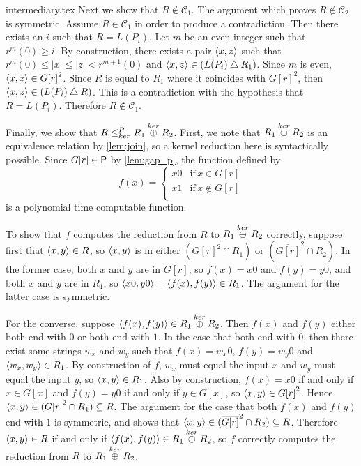 \begin{filecontents}{intermediary.tex}
  Next we show that $R\notin\mathcal{C}_1$.
  The argument which proves $R\notin\mathcal{C}_2$ is symmetric.
  Assume $R\in\mathcal{C}_1$ in order to produce a contradiction.
  Then there exists an $i$ such that $R=L(P_i)$.
  Let $m$ be an even integer such that $r^m(0)\geq i$.
  By construction, there exists a pair $\pair{x}{z}$ such that $r^m(0)\leq|x|\leq|z|<r^{m+1}(0)$ and $\pair{x}{z}\in(L(P_i)\symdiff R_1)$.
  Since $m$ is even, $\pair{x}{z}\in {G[r]}^2$.
  Since $R$ is equal to $R_1$ where it coincides with ${G[r]}^2$, then $\pair{x}{z}\in(L(P_i)\symdiff R)$.
  This is a contradiction with the hypothesis that $R=L(P_i)$.
  Therefore $R\notin\mathcal{C}_1$.

  Finally, we show that $R\kr R_1\kj R_2$.
  First, we note that $R_1\kj R_2$ is an equivalence relation by \ref{lem:join}, so a kernel reduction here is syntactically possible.
  Since $G[r]\in\P$ by \ref{lem:gap_p}, the function defined by
  \begin{displaymath}
    f(x)=
    \begin{cases}
      x0 & \text{if}\, x\in G[r]\\
      x1 & \text{if}\, x\notin G[r]\\
    \end{cases}
  \end{displaymath}
  is a polynomial time computable function.
  
  To show that $f$ computes the reduction from $R$ to $R_1\kj R_2$ correctly, suppose first that $\pair{x}{y}\in R$, so $\pair{x}{y}$ is in either $({G[r]}^2\cap R_1)$ or $(\overline{G[r]}^2\cap R_2)$.
  In the former case, both $x$ and $y$ are in $G[r]$, so $f(x)=x0$ and $f(y)=y0$, and both $x$ and $y$ are in $R_1$, so $\pair{x0}{y0}=\pair{f(x)}{f(y)}\in R_1$.
  The argument for the latter case is symmetric.

  For the converse, suppose $\pair{f(x)}{f(y)}\in R_1\kj R_2$.
  Then $f(x)$ and $f(y)$ either both end with $0$ or both end with $1$.
  In the case that both end with $0$, then there exist some strings $w_x$ and $w_y$ such that $f(x)=w_x0$, $f(y)=w_y0$ and $\pair{w_x}{w_y}\in R_1$.
  By construction of $f$, $w_x$ must equal the input $x$ and $w_y$ must equal the input $y$, so $\pair{x}{y}\in R_1$.
  Also by construction, $f(x)=x0$ if and only if $x\in G[x]$ and $f(y)=y0$ if and only if $y\in G[x]$, so $\pair{x}{y}\in{G[r]}^2$.
  Hence $\pair{x}{y}\in({G[r]}^2\cap R_1)\subseteq R$.
  The argument for the case that both $f(x)$ and $f(y)$ end with $1$ is symmetric, and shows that $\pair{x}{y}\in(\overline{G[r]}^2\cap R_2)\subseteq R$.
  Therefore $\pair{x}{y}\in R$ if and only if $\pair{f(x)}{f(y)}\in R_1\kj R_2$, so $f$ correctly computes the reduction from $R$ to $R_1\kj R_2$.


\end{filecontents}
